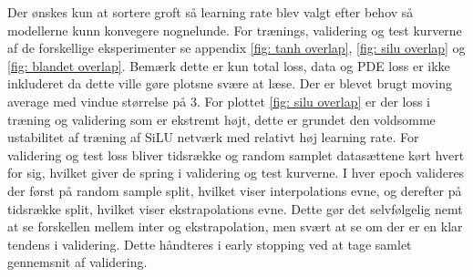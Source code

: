 Der ønskes kun at sortere groft så learning rate blev valgt efter behov så modellerne kunn konvegere nognelunde.
For trænings, validering og test kurverne af de forskellige eksperimenter se appendix \ref{fig: tanh overlap}, \ref{fig: silu overlap} og \ref{fig: blandet overlap}.
Bemærk dette er kun total loss, data og PDE loss er ikke inkluderet da dette ville gøre plotsne svære at læse. Der er blevet brugt moving average med vindue størrelse på 3.
For plottet \ref{fig: silu overlap} er der loss i træning og validering som er ekstremt højt, dette er grundet den voldsomme ustabilitet af træning af SiLU netværk med relativt høj learning rate.
For validering og test loss bliver tidsrække og random samplet datasættene kørt hvert for sig, hvilket giver de spring i validering og test kurverne.
I hver epoch valideres der først på random sample split, hvilket viser interpolations evne, og derefter på tidsrække split, hvilket viser ekstrapolations evne. 
Dette gør det selvfølgelig nemt at se forskellen mellem inter og ekstrapolation, men svært at se om der er en klar tendens i validering. 
Dette håndteres i early stopping ved at tage samlet gennemsnit af validering.

